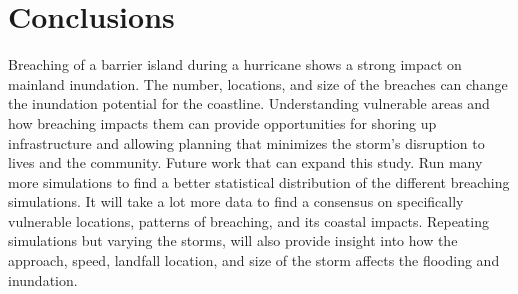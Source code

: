 \documentclass{coastal_paper}
\begin{document}
\section{Conclusions}
Breaching of a barrier island during a hurricane shows a strong impact on mainland inundation. The number, locations, and size of the breaches can change the inundation potential for the coastline. Understanding vulnerable areas and how breaching impacts them can provide opportunities for shoring up infrastructure and allowing planning that minimizes the storm's disruption to lives and the community.
Future work that can expand this study. Run many more simulations to find a better statistical distribution of the different breaching simulations. It will take a lot more data to find a consensus on specifically vulnerable locations, patterns of breaching, and its coastal impacts. Repeating simulations but varying the storms, will also provide insight into how the approach, speed, landfall location, and size of the storm affects the flooding and inundation.



\end{document}
